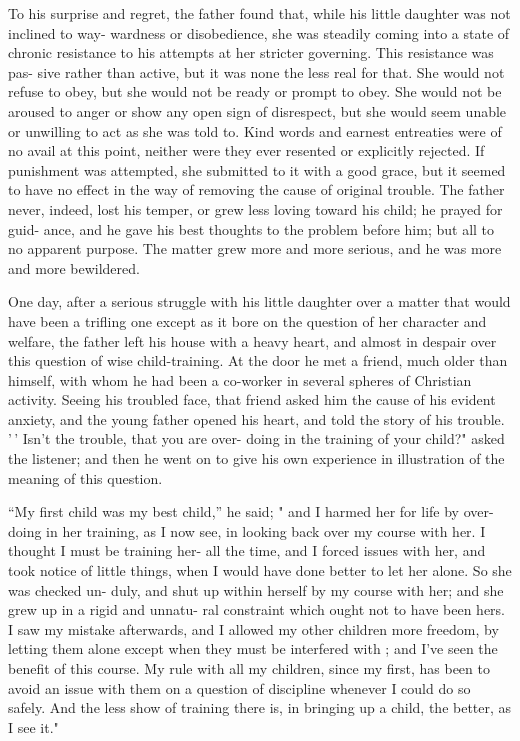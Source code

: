 \documentclass[
]{book}
\begin{document}
To his surprise and regret, the father found that, while his little daughter was not inclined to way- wardness or disobedience, she was steadily coming into a state of chronic resistance to his attempts at her stricter governing. This resistance was pas- sive rather than active, but it was none the less real for that. She would not refuse to obey, but she would not be ready or prompt to obey. She would not be aroused to anger or show any open sign of disrespect, but she would seem unable or unwilling to act as she was told to. Kind words and earnest entreaties were of no avail at this point, neither were they ever resented or explicitly rejected. If punishment was attempted, she submitted to it with a good grace, but it seemed to have no effect in the way of removing the cause of original trouble. The father never, indeed, lost his temper, or grew less loving toward his child; he prayed for guid- ance, and he gave his best thoughts to the problem before him; but all to no apparent purpose. The matter grew more and more serious, and he was more and more bewildered.

One day, after a serious struggle with his little daughter over a matter that would have been a trifling one except as it bore on the question of her character and welfare, the father left his house with a heavy heart, and almost in despair over this question of wise child-training. At the door he met a friend, much older than himself, with whom he had been a co-worker in several spheres of Christian activity. Seeing his troubled face, that friend asked him the cause of his evident anxiety, and the young father opened his heart, and told the story of his trouble. '\,' Isn't the trouble, that you are over- doing in the training of your child?" asked the listener; and then he went on to give his own experience in illustration of the meaning of this question.

``My first child was my best child,'' he said; " and I harmed her for life by over-doing in her training, as I now see, in looking back over my course with her. I thought I must be training her- all the time, and I forced issues with her, and took notice of little things, when I would have done better to let her alone. So she was checked un- duly, and shut up within herself by my course with her; and she grew up in a rigid and unnatu- ral constraint which ought not to have been hers. I saw my mistake afterwards, and I allowed my other children more freedom, by letting them alone except when they must be interfered with ; and I've seen the benefit of this course. My rule with all my children, since my first, has been to avoid an issue with them on a question of discipline whenever I could do so safely. And the less show of training there is, in bringing up a child, the better, as I see it."
\end{document}
